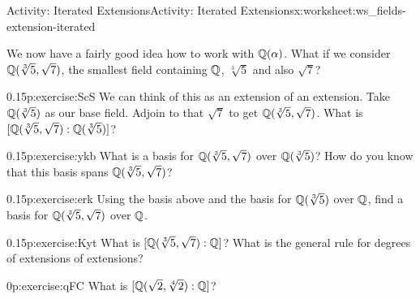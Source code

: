 \documentclass[11pt]{book}
\begin{document}
%
%
\typeout{************************************************}
\typeout{************************************************}
%
\begin{worksheet-subsection}{Activity: Iterated Extensions}{}{Activity: Iterated Extensions}{}{}{x:worksheet:ws_fields-extension-iterated}
\begin{introduction}{}%
We now have a fairly good idea how to work with \(\mathbb{Q}(\alpha)\).  What if we consider \(\mathbb{Q}(\sqrt[3]{5}, \sqrt{7})\), the smallest field containing \(\mathbb{Q}\), \(\sqrt[3]{5}\) and also \(\sqrt{7}\)?%
\end{introduction}%
\begin{divisionexercise}{1}{}{0.15}{p:exercise:ScS}%
We can think of this as an extension of an extension.  Take \(\mathbb{Q}(\sqrt[3]{5})\) as our base field.  Adjoin to that \(\sqrt{7}\) to get \(\mathbb{Q}(\sqrt[3]{5}, \sqrt{7})\). What is \([\mathbb{Q}(\sqrt[3]{5}, \sqrt{7}):\mathbb{Q}(\sqrt[3]{5})]\)?%
\end{divisionexercise}%
\begin{divisionexercise}{2}{}{0.15}{p:exercise:ykb}%
What is a basis for \(\mathbb{Q}(\sqrt[3]{5}, \sqrt{7})\) over \(\mathbb{Q}(\sqrt[3]{5})\)?  How do you know that this basis spans \(\mathbb{Q}(\sqrt[3]{5}, \sqrt{7})\)?%
\end{divisionexercise}%
\begin{divisionexercise}{3}{}{0.15}{p:exercise:erk}%
Using the basis above and the basis for \(\mathbb{Q}(\sqrt[3]{5})\) over \(\mathbb{Q}\), find a basis for \(\mathbb{Q}(\sqrt[3]{5}, \sqrt{7})\) over \(\mathbb{Q}\).%
\end{divisionexercise}%
\begin{divisionexercise}{4}{}{0.15}{p:exercise:Kyt}%
What is \([\mathbb{Q}(\sqrt[3]{5}, \sqrt{7}):\mathbb{Q}]\)?  What is the general rule for degrees of extensions of extensions?%
\end{divisionexercise}%
\begin{divisionexercise}{5}{}{0}{p:exercise:qFC}%
What is \([\mathbb{Q}(\sqrt{2}, \sqrt[4]{2}):\mathbb{Q}]\)?%
\end{divisionexercise}%
\end{worksheet-subsection}
\restoregeometry
\end{document}
